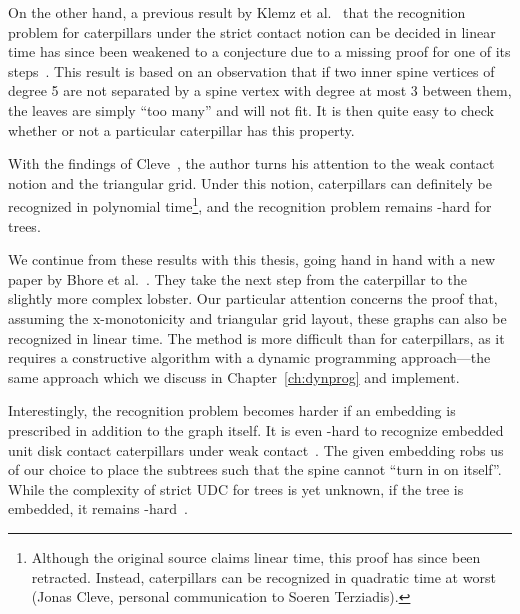 On the other hand, a previous result by Klemz et al.~\cite{Klemz2015} that the recognition problem for caterpillars under the strict contact notion can be decided in linear time has since been weakened to a conjecture due to a missing proof for one of its steps~\cite{klemz_recognizing_2022}. This result is based on an observation that if two inner spine vertices of degree 5 are not separated by a spine vertex with degree at most 3 between them, the leaves are simply ``too many'' and will not fit. It is then quite easy to check whether or not a particular caterpillar has this property.

With the findings of Cleve~\cite{Cleve2020}, the author turns his attention to the weak contact notion and the triangular grid. Under this notion, caterpillars can definitely be recognized in polynomial time\footnote{Although the original source claims linear time, this proof has since been retracted. Instead, caterpillars can be recognized in quadratic time at worst (Jonas Cleve, personal communication to Soeren Terziadis).}, and the recognition problem remains \NP-hard for trees.

We continue from these results with this thesis, going hand in hand with a new paper by Bhore et al.~\cite{Bhore2021}. They take the next step from the caterpillar to the slightly more complex lobster. Our particular attention concerns the proof that, assuming the x-monotonicity and triangular grid layout, these graphs can also be recognized in linear time. The method is more difficult than for caterpillars, as it requires a constructive algorithm with a dynamic programming approach---the same approach which we discuss in Chapter~\ref{ch:dynprog} and implement.

Interestingly, the recognition problem becomes harder if an embedding is prescribed in addition to the graph itself. It is even \NP-hard to recognize embedded unit disk contact caterpillars under weak contact~\cite{Chiu2019}. The given embedding robs us of our choice to place the subtrees such that the spine cannot ``turn in on itself''. While the complexity of strict UDC for trees is yet unknown, if the tree is embedded, it remains \NP-hard~\cite{Bowen2015}.
